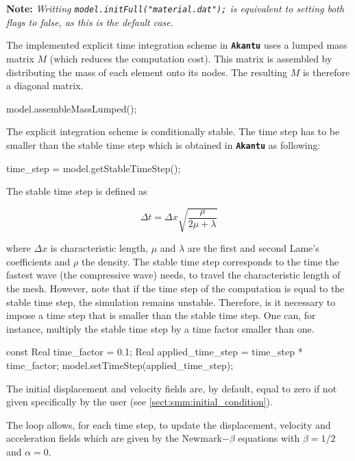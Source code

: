 \documentclass[a4paper,11pt]{book}
\newcommand{\akantu}{\texttt{\textbf{Akantu}}\xspace}
\newcommand{\code}[1]{\texttt{#1}}
\newcommand{\note}[1]{\textbf{Note: }\textit{#1}}
\begin{document}
\note{Writting \code{model.initFull("material.dat");} is equivalent to setting both flags to false, as this is the default case.}

The implemented explicit time integration scheme in \akantu uses a lumped mass matrix $M$ (which reduces the computation cost). This matrix is assembled by distributing the mass of each element onto its nodes. The resulting $M$ is therefore a diagonal matrix.

\begin{cpp}
  model.assembleMassLumped();
\end{cpp}

The explicit integration scheme is conditionally stable. The time step has to be smaller than the stable time step which is obtained in \akantu as following: 

\begin{cpp}
  time_step = model.getStableTimeStep();
\end{cpp}

The stable time step is defined as

\begin{equation}
  \Delta t = \Delta x \sqrt{\frac{\rho}{2 \mu +\lambda}}
\end{equation}
\label{eqn:smm:explicit:stabletime}

where $\Delta x$ is characteristic length, $\mu$ and $\lambda$ are the 
first and second Lame's coefficients and $\rho$ the density. The stable time step corresponds to the time the fastest wave (the compressive wave) needs, to travel the characteristic length of the mesh. 
However, note that if the time step of the computation is equal to the stable time step, 
the simulation remains unstable. Therefore, is it necessary to impose a time step that is smaller than the stable time step. One can, for instance, multiply  the stable time step by a time factor smaller than one. 

\begin{cpp}
  const Real time_factor = 0.1;
  Real applied_time_step = time_step * time_factor;
  model.setTimeStep(applied_time_step);
\end{cpp}
 
The initial displacement and velocity fields are, by default, equal to zero if not given specifically by the user (see \ref{sect:smm:initial_condition}).

The loop allows, for each time step, to update the displacement, velocity 
and acceleration fields which are given by the Newmark$-\beta$ equations with $\beta=1/2$ 
and $\alpha=0$.
\end{document}

